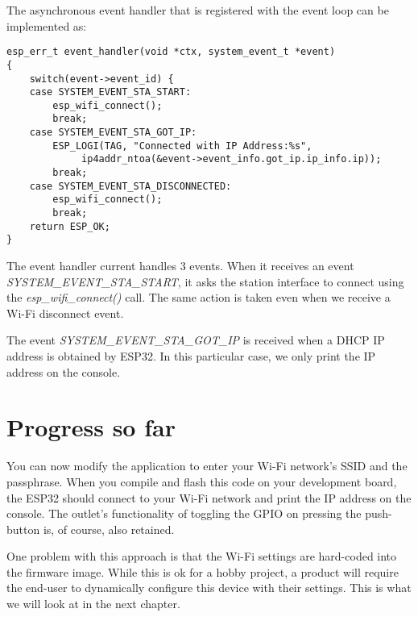 \documentclass[main.tex]{subfiles}
\begin{document}
The asynchronous event handler that is registered with the event loop can be implemented as:
\begin{verbatim}
esp_err_t event_handler(void *ctx, system_event_t *event)
{
    switch(event->event_id) {
    case SYSTEM_EVENT_STA_START:
        esp_wifi_connect();
        break;
    case SYSTEM_EVENT_STA_GOT_IP:
        ESP_LOGI(TAG, "Connected with IP Address:%s",  
             ip4addr_ntoa(&event->event_info.got_ip.ip_info.ip));
        break;
    case SYSTEM_EVENT_STA_DISCONNECTED:
        esp_wifi_connect();
        break;
    return ESP_OK;
}
\end{verbatim}

The event handler current handles 3 events. When it receives an event \textit{SYSTEM\_EVENT\_STA\_START}, it asks the station interface to connect using the \textit{esp\_wifi\_connect()} call. The same action is taken even when we receive a Wi-Fi disconnect event.

The event \textit{SYSTEM\_EVENT\_STA\_GOT\_IP} is received when a DHCP IP address is obtained by ESP32. In this particular case, we  only print the IP address on the console.

\section{Progress so far}
You can now modify the application to enter your Wi-Fi network's SSID and the passphrase. When you compile and flash this code on your development board, the ESP32 should connect to your Wi-Fi network and print the IP address on the console. The outlet's functionality of toggling the GPIO on pressing the push-button is, of course, also retained.

One problem with this approach is that the Wi-Fi settings are hard-coded into the firmware image. While this is ok for a hobby project, a product will require the end-user to dynamically configure this device with their settings. This is what we will look at in the next chapter.
\end{document}
